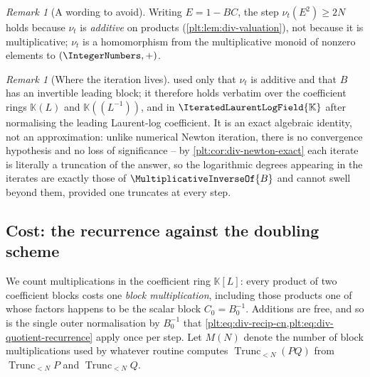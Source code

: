 \documentclass[11pt,oneside]{article}
\theoremstyle{plain}
\theoremstyle{definition}
\theoremstyle{remark}
\newtheorem{remark}[theorem]{Remark}
\newcommand{\K}{\mathbb{K}}
\newcommand{\PLit}{\IteratedLaurentLogField{\K}}         %
\newcommand{\ordt}{\nu_{t}}                              %
\newcommand{\Trunc}[2]{\operatorname{Trunc}_{<#2}#1}     %
\newcommand{\recip}[1]{\MultiplicativeInverseOf{#1}}
\begin{document}
\begin{remark}[A wording to avoid]\label{plt:rmk:div-valuation-additive}
Writing \(E=1-BC\), the step \(\ordt(E^{2})\ge2N\) holds because \(\ordt\) is
\emph{additive} on products (\cref{plt:lem:div-valuation}), not because it is
multiplicative;
\(\ordt\) is a homomorphism from the multiplicative monoid of nonzero elements
to \((\IntegerNumbers,+)\).
\end{remark}

\begin{remark}[Where the iteration lives]
 used only that \(\ordt\) is additive and that
\(B\) has an invertible leading block; it therefore holds verbatim over the
coefficient rings \(\K(L)\) and \(\K((L^{-1}))\), and in \(\PLit\) after
normalising the leading Laurent-log coefficient.  It is an exact algebraic
identity, not an approximation: unlike numerical Newton iteration, there is no
convergence hypothesis and no loss of significance -- by
\cref{plt:cor:div-newton-exact} each iterate is literally a truncation of the
answer, so the logarithmic degrees appearing in the iterates are exactly those
of \(\recip{B}\) and cannot swell beyond them, provided one truncates at every
step.
\end{remark}

\subsection{Cost: the recurrence against the doubling scheme}
\label{plt:sec:div-cost}

We count multiplications in the coefficient ring \(\K[L]\): every product of
two coefficient blocks costs one \emph{block multiplication}, including those
products one of whose factors happens to be the scalar block
\(C_{0}=B_{0}^{-1}\).  Additions are free, and so is the single outer
normalisation by \(B_{0}^{-1}\) that
\cref{plt:eq:div-recip-cn,plt:eq:div-quotient-recurrence} apply once per step.
Let \(M(N)\) denote the number of block multiplications used by whatever
routine computes \(\Trunc{(PQ)}{N}\) from \(\Trunc{P}{N}\) and
\(\Trunc{Q}{N}\).
\end{document}
